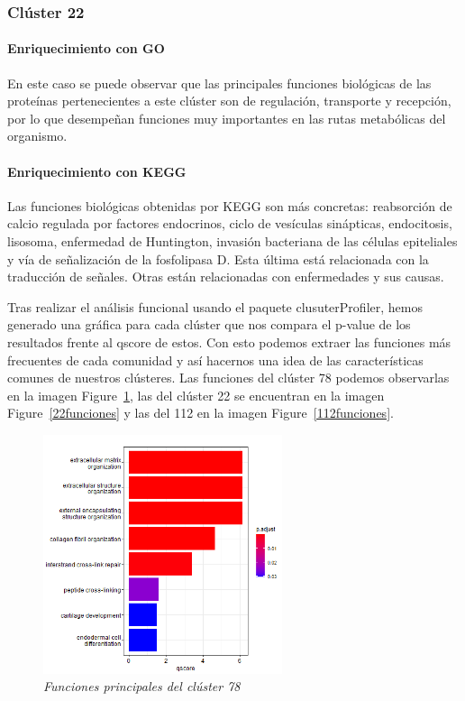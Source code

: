 \subsubsection{Clúster 22}

\paragraph{Enriquecimiento con GO}

En este caso se puede observar que las principales funciones biológicas de las proteínas pertenecientes a este clúster son de regulación, transporte y recepción, por lo que desempeñan funciones muy importantes en las rutas metabólicas del organismo. 

\paragraph{Enriquecimiento con KEGG}

Las funciones biológicas obtenidas por KEGG son más concretas: reabsorción de calcio regulada por factores endocrinos, ciclo de vesículas sinápticas, endocitosis, lisosoma, enfermedad de Huntington, invasión bacteriana de las células epiteliales y vía de señalización de la fosfolipasa D. Esta última está relacionada con la traducción de señales. Otras están relacionadas con enfermedades y sus causas.

Tras realizar el análisis funcional usando el paquete clusuterProfiler, hemos generado una gráfica para cada clúster que nos compara el p-value de los resultados frente al qscore de estos. Con esto podemos extraer las funciones más frecuentes de cada comunidad y así hacernos una idea de las características comunes de nuestros clústeres. Las funciones del clúster 78 podemos observarlas en la imagen Figure~\ref{78funciones}, las del clúster 22 se encuentran en la imagen Figure~\ref{22funciones} y las del 112 en la imagen Figure~\ref{112funciones}.

\begin{figure}[h]
	\centering
	\includegraphics[width=70mm,scale=1.2]{figures/funcionesGO78.png}
	\caption{\textit{Funciones principales del clúster 78}}
	\label{78funciones}
\end{figure}

